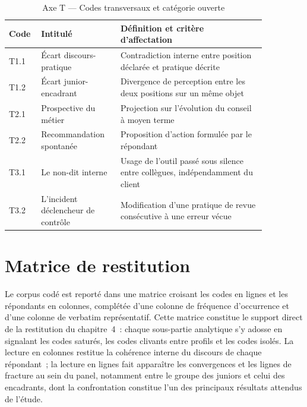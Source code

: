 \begin{table}[h]
\centering
\small
\begin{tabular}{|p{0.08\linewidth}|p{0.27\linewidth}|p{0.51\linewidth}|}
\hline
\textbf{Code} & \textbf{Intitulé} & \textbf{Définition et critère d'affectation} \\
\hline
T1.1 & Écart discours-pratique & Contradiction interne entre position déclarée et pratique décrite \\
\hline
T1.2 & Écart junior-encadrant & Divergence de perception entre les deux positions sur un même objet \\
\hline
T2.1 & Prospective du métier & Projection sur l'évolution du conseil à moyen terme \\
\hline
T2.2 & Recommandation spontanée & Proposition d'action formulée par le répondant \\
\hline
T3.1 & Le non-dit interne & Usage de l'outil passé sous silence entre collègues, indépendamment du client \\
\hline
T3.2 & L'incident déclencheur de contrôle & Modification d'une pratique de revue consécutive à une erreur vécue \\
\hline
\end{tabular}
\caption{Axe T --- Codes transversaux et catégorie ouverte}
\label{tab:codebook-t}
\end{table}

\section{Matrice de restitution}

Le corpus codé est reporté dans une matrice croisant les codes en lignes et les
répondants en colonnes, complétée d'une colonne de fréquence d'occurrence et d'une
colonne de verbatim représentatif. Cette matrice constitue le support direct de la
restitution du chapitre~4~: chaque sous-partie analytique s'y adosse en signalant les
codes saturés, les codes clivants entre profils et les codes isolés. La lecture en
colonnes restitue la cohérence interne du discours de chaque répondant~; la lecture en
lignes fait apparaître les convergences et les lignes de fracture au sein du panel,
notamment entre le groupe des juniors et celui des encadrants, dont la confrontation
constitue l'un des principaux résultats attendus de l'étude.